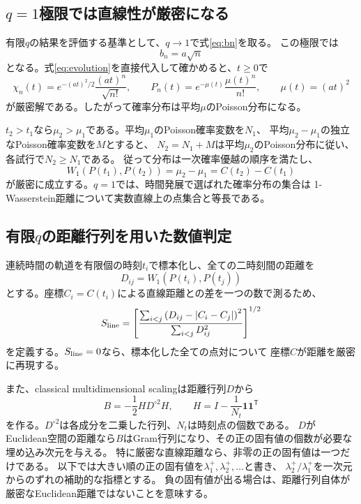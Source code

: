 \documentclass[a4paper,11pt]{ltjsarticle}
\numberwithin{equation}{section}
\begin{document}
\subsection{$q=1$極限では直線性が厳密になる}
有限$q$の結果を評価する基準として、$q\to1$で式\eqref{eq:bn}を取る。
この極限では
\begin{equation}
 b_n=a\sqrt n
 \label{eq:q1-bn}
\end{equation}
となる。式\eqref{eq:evolution}を直接代入して確かめると、$t\geq0$で
\begin{equation}
 \chi_n(t)=e^{-(at)^2/2}\frac{(at)^n}{\sqrt{n!}},\qquad
 P_n(t)=e^{-\mu(t)}\frac{\mu(t)^n}{n!},\qquad
 \mu(t)=(at)^2
 \label{eq:poisson}
\end{equation}
が厳密解である。したがって確率分布は平均$\mu$のPoisson分布になる。

$t_2>t_1$なら$\mu_2>\mu_1$である。平均$\mu_1$のPoisson確率変数を$N_1$、
平均$\mu_2-\mu_1$の独立なPoisson確率変数を$M$とすると、
$N_2=N_1+M$は平均$\mu_2$のPoisson分布に従い、各試行で$N_2\geq N_1$である。
従って分布は一次確率優越の順序を満たし、
\begin{equation}
 W_1(P(t_1),P(t_2))=\mu_2-\mu_1
 =C(t_2)-C(t_1)
 \label{eq:q1-line}
\end{equation}
が厳密に成立する。$q=1$では、時間発展で選ばれた確率分布の集合は
1-Wasserstein距離について実数直線上の点集合と等長である。

\subsection{有限$q$の距離行列を用いた数値判定}
連続時間の軌道を有限個の時刻$t_i$で標本化し、全ての二時刻間の距離を
\begin{equation}
 D_{ij}=W_1(P(t_i),P(t_j))
 \label{eq:distance-matrix}
\end{equation}
とする。座標$C_i=C(t_i)$による直線距離との差を一つの数で測るため、
\begin{equation}
 S_{\rm line}=
 \left[
 \frac{\sum_{i<j}\left(D_{ij}-|C_i-C_j|\right)^2}
 {\sum_{i<j}D_{ij}^2}
 \right]^{1/2}
 \label{eq:line-deviation}
\end{equation}
を定義する。$S_{\rm line}=0$なら、標本化した全ての点対について
座標$C$が距離を厳密に再現する。

また、classical multidimensional scalingは距離行列$D$から
\begin{equation}
 B=-\frac12 H D^{\circ2}H,
 \qquad H=I-\frac1{N_t}{\bm 1}{\bm 1}^{\mathsf T}
 \label{eq:mds-gram}
\end{equation}
を作る。$D^{\circ2}$は各成分を二乗した行列、$N_t$は時刻点の個数である。
$D$がEuclidean空間の距離なら$B$はGram行列になり、その正の固有値の個数が必要な埋め込み次元を与える。
特に厳密な直線距離なら、非零の正の固有値は一つだけである。
以下では大きい順の正の固有値を$\lambda_1^+,\lambda_2^+,\ldots$と書き、
$\lambda_2^+/\lambda_1^+$を一次元からのずれの補助的な指標とする。
負の固有値が出る場合は、距離行列自体が厳密なEuclidean距離ではないことを意味する。
\end{document}
